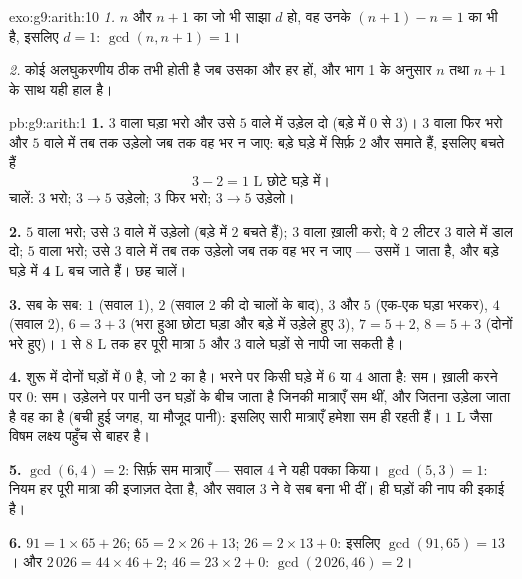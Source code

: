 \begin{solution}{exo:g9:arith:10}
\emph{1.} $n$ और $n+1$ का जो भी साझा  $d$ हो, वह उनके 
$(n+1) - n = 1$ का भी  है, इसलिए $d = 1$: $\gcd(n, n+1) = 1$।

\emph{2.} कोई  अलघुकरणीय ठीक तभी होती है जब उसका  और हर
 हों, और भाग 1 के अनुसार $n$ तथा $n + 1$ के साथ यही हाल है।
\end{solution}

\begin{solution}{pb:g9:arith:1}
\textbf{1.} $3$ वाला घड़ा भरो और उसे $5$ वाले में उड़ेल दो (बड़े में
$0$ से $3$)। $3$ वाला फिर भरो और $5$ वाले में तब तक उड़ेलो जब तक वह
भर न जाए: बड़े घड़े में सिर्फ़ $2$ और समाते हैं, इसलिए बचते हैं
\[
3 - 2 = 1 \text{ L छोटे घड़े में।}
\]
चालें: $3$ भरो; $3 \to 5$ उड़ेलो; $3$ फिर भरो; $3 \to 5$ उड़ेलो।

\textbf{2.} $5$ वाला भरो; उसे $3$ वाले में उड़ेलो (बड़े में $2$ बचते
हैं); $3$ वाला ख़ाली करो; वे $2$ लीटर $3$ वाले में डाल दो; $5$ वाला
भरो; उसे $3$ वाले में तब तक उड़ेलो जब तक वह भर न जाए --- उसमें $1$
जाता है, और बड़े घड़े में $\mathbf{4}$ L बच जाते हैं। छह चालें।

\textbf{3.} सब के सब: $1$ (सवाल 1), $2$ (सवाल 2 की दो चालों के बाद),
$3$ और $5$ (एक-एक घड़ा भरकर), $4$ (सवाल 2), $6 = 3 + 3$ (भरा हुआ छोटा
घड़ा और बड़े में उड़ेले हुए $3$), $7 = 5 + 2$, $8 = 5 + 3$ (दोनों भरे
हुए)। $1$ से $8$ L तक हर पूरी मात्रा $5$ और $3$ वाले घड़ों से नापी जा
सकती है।

\textbf{4.} शुरू में दोनों घड़ों में $0$ है, जो $2$ का  है। भरने
पर किसी घड़े में $6$ या $4$ आता है: सम। ख़ाली करने पर $0$: सम। उड़ेलने
पर पानी उन घड़ों के बीच जाता है जिनकी मात्राएँ सम थीं, और जितना
उड़ेला जाता है वह  का  है (बची हुई जगह, या मौजूद
पानी): इसलिए सारी मात्राएँ हमेशा सम ही रहती हैं। $1$ L जैसा विषम
लक्ष्य पहुँच से बाहर है।

\textbf{5.} $\gcd(6, 4) = 2$: सिर्फ़ सम मात्राएँ --- सवाल 4 ने यही
पक्का किया। $\gcd(5, 3) = 1$: नियम हर पूरी मात्रा की इजाज़त देता है,
और सवाल 3 ने वे सब बना भी दीं।  ही घड़ों की नाप की
इकाई है।

\textbf{6.} $91 = 1 \times 65 + 26$; $65 = 2 \times 26 + 13$;
$26 = 2 \times 13 + 0$: इसलिए $\gcd(91, 65) = 13$। और
$2\,026 = 44 \times 46 + 2$; $46 = 23 \times 2 + 0$:
$\gcd(2\,026, 46) = 2$।


\end{solution}
